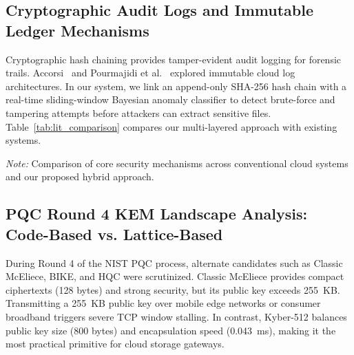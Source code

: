 \documentclass[sn-mathphys,Numbered]{sn-jnl}%
\theoremstyle{thmstyleone}%
\theoremstyle{thmstyletwo}%
\theoremstyle{thmstylethree}%
\begin{document}
\subsection{\textbf{Cryptographic Audit Logs and Immutable Ledger Mechanisms}}
Cryptographic hash chaining provides tamper-evident audit logging for forensic trails. Accorsi~\cite{accorsi2009safe} and Pourmajidi et al.~\cite{pourmajidi2018logchain} explored immutable cloud log architectures. In our system, we link an append-only SHA-256 hash chain with a real-time sliding-window Bayesian anomaly classifier to detect brute-force and tampering attempts before attackers can extract sensitive files. Table~\ref{tab:lit_comparison} compares our multi-layered approach with existing systems.

\begin{table}[!htbp]
\centering
\caption{Architectural comparison across classical, pure post-quantum, and hybrid cloud storage systems.}
\label{tab:lit_comparison}
\vspace{0.3em}
\raggedright\small\textit{Note:} Comparison of core security mechanisms across conventional cloud systems and our proposed hybrid approach.
\end{table}

\subsection{\textbf{PQC Round 4 KEM Landscape Analysis: Code-Based vs. Lattice-Based}}
During Round 4 of the NIST PQC process, alternate candidates such as Classic McEliece, BIKE, and HQC were scrutinized. Classic McEliece provides compact ciphertexts (128 bytes) and strong security, but its public key exceeds 255~KB. Transmitting a 255~KB public key over mobile edge networks or consumer broadband triggers severe TCP window stalling. In contrast, Kyber-512 balances public key size (800 bytes) and encapsulation speed (0.043~ms), making it the most practical primitive for cloud storage gateways.
\end{document}
